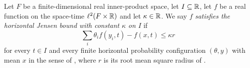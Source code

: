 \begin{definition}
Let $F$ be a finite-dimensional real inner-product space, let $I\subseteq\mathbb{R}$,
let $f$ be a real function on the space-time $\ell^2(F\times\mathbb{R})$ and let
$\kappa\in\mathbb{R}$. We say $f$ \emph{satisfies the horizontal Jensen bound with
constant $\kappa$ on $I$} if
\[
  \sum_i\theta_i f(y_i,t)-f(x,t)\le\kappa r
\]
for every $t\in I$ and every finite horizontal probability configuration
$(\theta,y)$ with mean $x$ in the sense of , where
$r$ is its root mean square radius of .
\end{definition}
